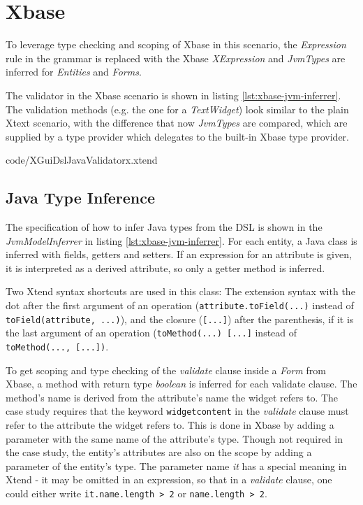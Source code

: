 \section{Xbase}
\label{sec:xbase}

To leverage type checking and scoping of Xbase in this scenario, the
\emph{Expression} rule in the grammar is replaced with the Xbase
\emph{XExpression} and \emph{JvmTypes} are inferred for \emph{Entities} and
\emph{Forms}.

The validator in the Xbase scenario is shown in listing
\ref{lst:xbase-jvm-inferrer}. The validation methods (e.g. the one for a
\emph{TextWidget}) look similar to the plain Xtext scenario, with the difference
that now \emph{JvmTypes} are compared, which are supplied by a type provider
which delegates to the built-in Xbase type provider.

	{code/XGuiDslJavaValidatorx.xtend}

\subsection{Java Type Inference}
The specification of how to infer Java types from the DSL is shown in the
\emph{JvmModelInferrer} in listing \ref{lst:xbase-jvm-inferrer}.  For each
entity, a Java class is inferred with fields, getters and setters. If an
expression for an attribute is given, it is interpreted as a derived attribute,
so only a getter method is inferred.

Two Xtend syntax shortcuts are used in this class: The extension syntax with the
dot after the first argument of an operation (\verb|attribute.toField(...)|
instead of \verb|toField(attribute, ...)|), and the closure (\verb|[...]|) after
the parenthesis, if it is the last argument of an operation
(\lstinline[basicstyle=\ttfamily]{toMethod(...) [...]} instead of
\lstinline[basicstyle=\ttfamily]{toMethod(..., [...])}.

To get scoping and type checking of the \emph{validate} clause inside a
\emph{Form} from Xbase, a method with return type \emph{boolean} is inferred for
each validate clause. The method's name is derived from the attribute's name the
widget refers to. The case study requires that the keyword \verb|widgetcontent|
in the \emph{validate} clause must refer to the attribute the widget refers to.
This is done in Xbase by adding a parameter with the same name of the
attribute's type. Though not required in the case study, the entity's attributes
are also on the scope by adding a parameter of the entity's type. The parameter
name \emph{it} has a special meaning in Xtend - it may be omitted in an
expression, so that in a \emph{validate} clause, one could either write
\lstinline[basicstyle=\ttfamily]{it.name.length > 2} or \verb|name.length > 2|.

